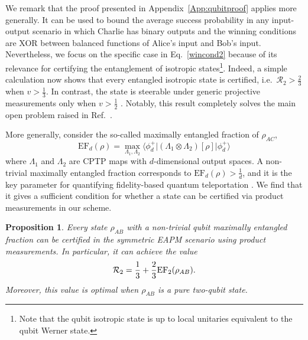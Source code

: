 \documentclass[aps,superscriptaddress,twocolumn,twoside,floatfix,pra,nofootinbib,a4paper]{revtex4-2}
\newcommand{\bracket}[3]{\langle#1\vert#2\vert#3\rangle}
\newtheorem{proposition}{Proposition}
\begin{document}
We remark that the proof presented in Appendix~\ref{App:qubitproof} applies more generally. It can be used to bound the average success probability in any input-output scenario in which  Charlie has binary outputs and the winning conditions are XOR between balanced functions of Alice's input and Bob's input. Nevertheless, we focus on the specific case in Eq.~\eqref{wincond2} because of its relevance for certifying the entanglement of isotropic states\footnote{Note that the qubit isotropic state is up to local unitaries equivalent to the qubit Werner state.}. Indeed, a simple calculation now shows that every entangled isotropic state is certified, i.e.~$\mathcal{R}_2>\frac{2}{3}$ when $v>\frac{1}{3}$. In contrast, the state is steerable under generic projective measurements only when $v>\frac{1}{2}$ \cite{Wiseman2007}. Notably, this result completely solves the main open problem raised in Ref.~\cite{Piveteau2022}. 

More generally,  consider the so-called maximally entangled fraction of $\rho_{AC}$,
\begin{equation}
\text{EF}_d(\rho)=\max_{\Lambda_1,\Lambda_2} \bracket{\phi^+_d}{(\Lambda_1 \otimes \Lambda_2) [\rho]}{\phi^+_d}
\end{equation}
where $\Lambda_1$ and $\Lambda_2$ are CPTP maps with $d$-dimensional output spaces. A non-trivial maximally entangled fraction corresponds to $\text{EF}_d(\rho)> \frac{1}{d}$, and it is the key parameter for quantifying fidelity-based quantum teleportation \cite{Horodecki1999}. We find that it gives a sufficient condition for whether a state can be certified via product measurements in our scheme.
\begin{proposition}\label{prop3}
Every state  $\rho_{AB}$ with a non-trivial qubit maximally entangled fraction can be certified in the symmetric EAPM scenario using product measurements. In particular, it can achieve the value 
	\begin{equation}\label{qubitSF}
\mathcal{R}_2=\frac{1}{3}+\frac{2}{3}{\rm EF}_2(\rho_{AB}).
\end{equation}	
Moreover, this value is optimal when $\rho_{AB}$ is a pure two-qubit state.
\end{proposition}
\end{document}
